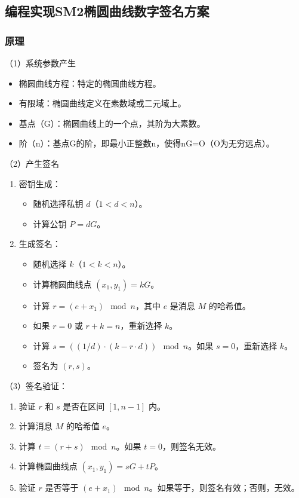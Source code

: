 \documentclass[a4paper,11pt,UTF8]{ctexart}
\begin{document}
    \subsection{编程实现SM2椭圆曲线数字签名方案}

        \subsubsection{原理}
          （1）系统参数产生
          \begin{itemize}
            \item 椭圆曲线方程：特定的椭圆曲线方程。
            \item 有限域：椭圆曲线定义在素数域或二元域上。
            \item 基点（G）：椭圆曲线上的一个点，其阶为大素数。
            \item 阶（n）：基点G的阶，即最小正整数n，使得nG=O（O为无穷远点）。
          \end{itemize}
          （2）产生签名
            \begin{enumerate}
              \item 密钥生成：
              \begin{itemize}
                  \item 随机选择私钥 $d$（$1 < d < n$）。
                  \item 计算公钥 $P = dG$。
              \end{itemize}
              \item 生成签名：
              \begin{itemize}
                  \item 随机选择 $k$（$1 < k < n$）。
                  \item 计算椭圆曲线点 $(x_1, y_1) = kG$。
                  \item 计算 $r = (e + x_1) \mod n$，其中 $e$ 是消息 $M$ 的哈希值。
                  \item 如果 $r=0$ 或 $r+k=n$，重新选择 $k$。
                  \item 计算 $s = ((1/d) \cdot (k - r \cdot d)) \mod n$。如果 $s=0$，重新选择 $k$。
                  \item 签名为 $(r, s)$。
              \end{itemize}
            \end{enumerate}
          （3）签名验证：
            \begin{enumerate}
              \item 验证 $r$ 和 $s$ 是否在区间 $[1, n-1]$ 内。
              \item 计算消息 $M$ 的哈希值 $e$。
              \item 计算 $t = (r + s) \mod n$。如果 $t=0$，则签名无效。
              \item 计算椭圆曲线点 $(x_1, y_1) = sG + tP$。
              \item 验证 $r$ 是否等于 $(e + x_1) \mod n$。如果等于，则签名有效；否则，无效。
            \end{enumerate}
\end{document}
